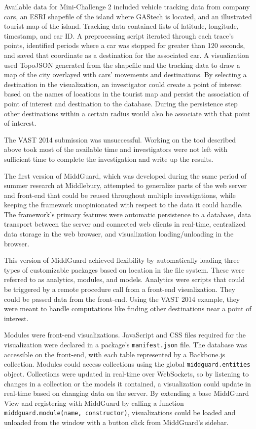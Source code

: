 Available data for Mini-Challenge 2 included vehicle tracking data from
company cars, an ESRI shapefile of the island where GAStech is located, and an
illustrated tourist map of the island. Tracking data contained lists of
latitude, longitude, timestamp, and car ID. A preprocessing script iterated
through each trace's points, identified periods where a car was stopped for
greater than 120 seconds, and saved that coordinate as a destination for the
associated car. A visualization used TopoJSON \cite{topojson-spec} generated
from the shapefile and the tracking data to draw a map of the city overlayed
with cars' movements and destinations. By selecting a destination in the
visualization, an investigator could create a point of interest based on the
names of locations in the tourist map and persist the association of point of
interest and destination to the database. During the persistence step other
destinations within a certain radius would also be associate with that point of
interest.

The VAST 2014 submission was unsuccessful. Working on the tool described above
took most of the available time and investigators were not left with sufficient
time to complete the investigation and write up the results.

The first version of MiddGuard, which was developed during the same period of
summer research at Middlebury, attempted to generalize parts of the web server
and front-end that could be reused throughout multiple investigations, while
keeping the framework unopinionated with respect to the data it could handle.
The framework's primary features were automatic persistence to a database, data
transport between the server and connected web clients in real-time, centralized
data storage in the web browser, and visualization loading/unloading in the
browser.

This version of MiddGuard achieved flexibility by automatically loading three
types of customizable packages based on location in the file system. These were
referred to as analytics, modules, and models. Analytics were scripts that could
be triggered by a remote procedure call from a front-end visualization. They
could be passed data from the front-end. Using the VAST 2014 example, they were
meant to handle computations like finding other destinations near a point of
interest.

Modules were front-end visualizations. JavaScript and CSS files required for the
visualization were declared in a package's \texttt{manifest.json} file. The
database was accessible on the front-end, with each table represented by a
Backbone.js collection. Modules could access collections using the global
\texttt{middguard.entities} object. Collections were updated in real-time over
WebSockets, so by listening to changes in a collection or the models it
contained, a visualization could update in real-time based on changing data on
the server. By extending a base MiddGuard View \cite{backbone} and registering
with MiddGuard by calling a function \texttt{middguard.module(name,
constructor)}, visualizations could be loaded and unloaded from the window with
a button click from MiddGuard's sidebar.

